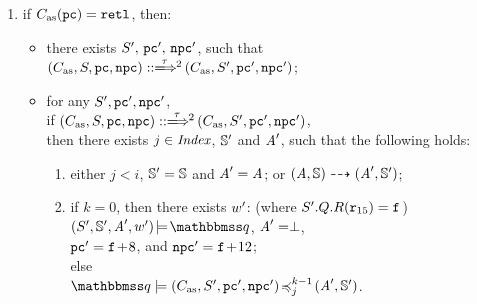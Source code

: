 \begin{definition}
\begin{enumerate}[1.]
        \item if $C_{\text{as}}(\texttt{pc}) = \texttt{retl}{}$, then:
            \begin{itemize}
                \item there exists $S', \, \texttt{pc}', \, \texttt{npc}'$,
                such that \\
                   $\LGlobMultiTrans{(\asmimp, \state, \pc, \npc)}
                       {\empmsg\,}{2}{(\asmimp, \state', \pc', \npc')}$;
                \item for any $S', \texttt{pc}', \texttt{npc}'$, \\
                    if $\LGlobMultiTrans{(\asmimp, \state, \pc, \npc)}
                            {\empmsg\,}{2}{(\asmimp, \state', \pc', \npc')}$, \\
                    then there exists $j \in \textit{Index}$, $\mathbb{S}'$ and
                    $\textit{A}'$, such that the following holds:
                    \begin{enumerate}
                        \item either $j < i$, $\mathbb{S}' = \mathbb{S}$
                            and $\textit{A}' = \textit{A}$; or
                            ${(\textit{A}, \mathbb{S})} \dashrightarrow {(\textit{A}', \mathbb{S}')}$;
                        \item if $k = 0$, then there exists
                        	$w'$:
                        	(where $S'.Q.R(\texttt{r}_{15})
                        	 = \texttt{f}_{}$) \\
                            \hspace*{2em}
                            $\asrtmodel{(\state', \hpstate', \primcom', \word')}
                                {\relastQ}$,
                            $\textit{A}' = \perp$, \\
                            \hspace*{2em}
                            $\texttt{pc}' = \texttt{f}_{}\!+\!8$, and
                            $\texttt{npc}' = \texttt{f}_{}\!+\!12$; \\
                            else \\
                            \hspace*{2em}
                            $\simFunctionSt{\relastQ}{(\asmimp, \state', \pc', \npc')}
                                {j}{k-1}{(\primcom', \hpstate')}$.
                    \end{enumerate}
            \end{itemize}
    \end{enumerate}
\end{definition}

